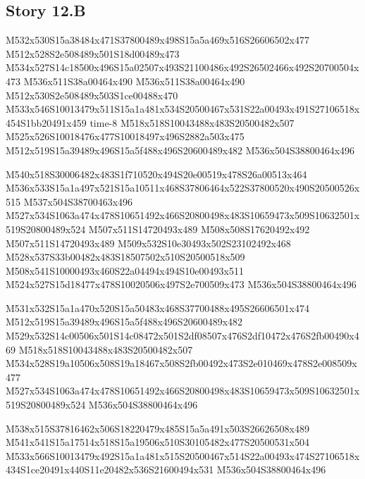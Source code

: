 \documentclass{article}
\begin{document}
\subsection{Story 12.B}

\begin{multicols}{5}
\begin{center}

M532x530S15a38484x471S37800489x498S15a5a469x516S26606502x477 %
M512x528S2e508489x501S18d00489x473 %
M534x527S14c18500x496S15a02507x493S21100486x492S26502466x492S20700504x473 %
M536x511S38a00464x490 %
M536x511S38a00464x490 %
M512x530S2e508489x503S1ce00488x470 %
M533x546S10013479x511S15a1a481x534S20500467x531S22a00493x491S27106518x454S1bb20491x459 time-8
M518x518S10043488x483S20500482x507 %
M525x526S10018476x477S10018497x496S2882a503x475 %
M512x519S15a39489x496S15a5f488x496S20600489x482 %
M536x504S38800464x496 %

M540x518S30006482x483S1f710520x494S20e00519x478S26a00513x464 %
M536x533S15a1a497x521S15a10511x468S37806464x522S37800520x490S20500526x515 %
M537x504S38700463x496 %
M527x534S1063a474x478S10651492x466S20800498x483S10659473x509S10632501x519S20800489x524 %
M507x511S14720493x489 %
M508x508S17620492x492 %
M507x511S14720493x489 %
M509x532S10e30493x502S23102492x468 %
M528x537S33b00482x483S18507502x510S20500518x509 %
M508x541S10000493x460S22a04494x494S10e00493x511 %
M524x527S15d18477x478S10020506x497S2e700509x473 %
M536x504S38800464x496 %

M531x532S15a1a470x520S15a50483x468S37700488x495S26606501x474 %
M512x519S15a39489x496S15a5f488x496S20600489x482 %
M529x532S14c00506x501S14c08472x501S2df08507x476S2df10472x476S2fb00490x469 %
M518x518S10043488x483S20500482x507 %
M534x528S19a10506x508S19a18467x508S2fb00492x473S2e010469x478S2e008509x477 %
M527x534S1063a474x478S10651492x466S20800498x483S10659473x509S10632501x519S20800489x524 %
M536x504S38800464x496 %

M538x515S37816462x506S18220479x485S15a5a491x503S26626508x489 %
M541x541S15a17514x518S15a19506x510S30105482x477S20500531x504 %
M533x566S10013479x492S15a1a481x515S20500467x514S22a00493x474S27106518x434S1ce20491x440S11e20482x536S21600494x531 %
M536x504S38800464x496 %

\end{center}
\end{multicols}
\end{document}
